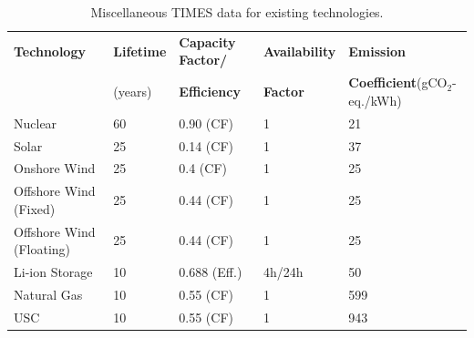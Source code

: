 \begin{table}[!ht]
	\caption{Miscellaneous \gls{TIMES} data for existing technologies.}
	\vspace{0.1in}
	\begin{tabularx}{1.2\textwidth}{p{} p{} p{} p{}  p{}}
		\hline
\textbf{Technology} &  \textbf{Lifetime} & \textbf{Capacity Factor/}  & \textbf{Availability} & \textbf{Emission}\\
  & (years) &  \textbf{Efficiency} & \textbf{Factor} & \textbf{Coefficient}(gCO$_2$-eq./kWh)\\
\hline
Nuclear & 60 & 0.90 (CF) & 1 & 21\\
Solar & 25 & 0.14 (CF) & 1 & 37\\
Onshore Wind & 25 & 0.4 (CF) & 1 & 25\\
Offshore Wind (Fixed) & 25 & 0.44 (CF) & 1 & 25\\
Offshore Wind (Floating) & 25 & 0.44 (CF) & 1 & 25\\
Li-ion Storage & 10 & 0.688 (Eff.) & 4h/24h & 50 \\
Natural Gas &  10 & 0.55 (CF) & 1 & 599  \\
\gls{USC} & 10 & 0.55 (CF) & 1 & 943  \\
\hline 
\end{tabularx}
\label{existing-misc}
\end{table}

